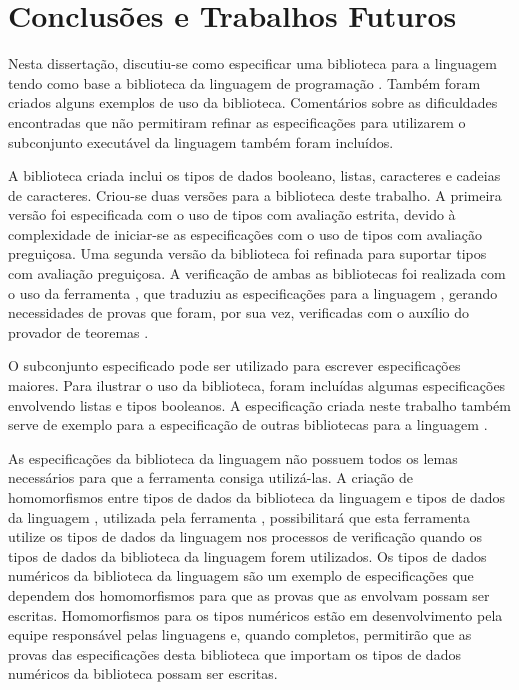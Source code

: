 \chapter{Conclusões e Trabalhos Futuros}
\label{chap:conclusao}

Nesta dissertação, discutiu-se como especificar uma biblioteca para a linguagem \HasCASL tendo como base a biblioteca \Prelude da linguagem de programação \Haskell.
Também foram criados alguns exemplos de uso da biblioteca.
Comentários sobre as dificuldades encontradas que não permitiram refinar as especificações para utilizarem o subconjunto executável da linguagem \HasCASL também foram incluídos.

A biblioteca criada inclui os tipos de dados booleano, listas, caracteres e cadeias de caracteres.
Criou-se duas versões para a biblioteca deste trabalho.
A primeira versão foi especificada com o uso de tipos com avaliação estrita, devido à complexidade de iniciar-se as especificações com o uso de tipos com avaliação preguiçosa.
Uma segunda versão da biblioteca foi refinada para suportar tipos com avaliação preguiçosa.
A verificação de ambas as bibliotecas foi realizada com o uso da ferramenta  \Hets, que traduziu as especificações para a linguagem \HOL, gerando necessidades de provas que foram, por sua vez, verificadas com o auxílio do provador de teoremas \Isabelle.

O subconjunto especificado pode ser utilizado para escrever especificações maiores.
Para ilustrar o uso da biblioteca, foram incluídas algumas especificações envolvendo listas e tipos booleanos.
A especificação criada neste trabalho também serve de exemplo para a especificação de outras bibliotecas para a linguagem \HasCASL.

As especificações da biblioteca da linguagem \CASL não possuem todos os lemas necessários para que a ferramenta \Isabelle consiga utilizá-las.
A criação de homomorfismos entre tipos de dados da biblioteca da linguagem \CASL e tipos de dados da linguagem \HOL, utilizada pela ferramenta \Isabelle, possibilitará que esta ferramenta utilize os tipos de dados da linguagem \HOL nos processos de verificação quando os tipos de dados da biblioteca da linguagem \CASL forem utilizados.
Os tipos de dados numéricos da biblioteca da linguagem \CASL são um exemplo de especificações que dependem dos homomorfismos para que as provas que as envolvam possam ser escritas.
Homomorfismos para os tipos numéricos estão em desenvolvimento pela equipe responsável pelas linguagens e, quando completos, permitirão que as provas das especificações desta biblioteca que importam os tipos de dados numéricos da biblioteca \CASL possam ser escritas.

